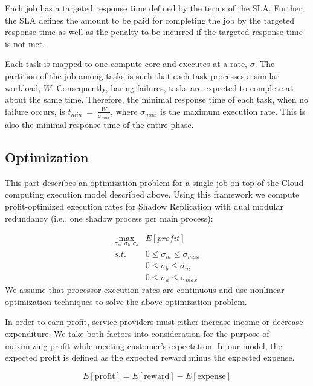 Each job has a targeted response time defined
by the terms of the SLA. Further, the SLA defines the amount to be
paid for completing the job by the targeted response time as well as
the penalty to be incurred if the targeted response time is not
met. 

Each task is mapped to one compute core and executes at a rate, $\sigma$. The partition of the job among tasks is
such that each task processes a similar
workload, $W$. Consequently, baring failures, tasks are expected to
complete at about the same time. Therefore, the minimal response time
of each task, when no failure occurs, is
$t_{min}~=~\frac{W}{\sigma_{max}}$, where $\sigma_{max}$ is the maximum execution rate. This is also the minimal response
time of the entire phase. 


\subsection{Optimization}
This part describes an optimization problem for a single job on top of the Cloud computing execution model described above. Using this
framework we compute profit-optimized execution rates for Shadow Replication with dual modular redundancy (i.e., one shadow process per main process): 

\begin{equation}
\label{optimization_problem}
\begin{alignedat}{2}
\max_{\sigma_m,\sigma_b,\sigma_a}     & E[profit] \\
s.t.                                 & 0 \leq \sigma_m \leq \sigma_{max} \\
                                     & 0 \leq \sigma_b \leq \sigma_{m} \\
                                     & 0 \leq \sigma_a \leq \sigma_{max} 
\end{alignedat}
\end{equation}
We assume that processor execution 
rates are continuous and use nonlinear optimization techniques
to solve the above optimization problem. 

In order to earn profit, service providers must either increase
income or decrease expenditure. We take both factors into
consideration for the purpose of maximizing profit while meeting
customer's expectation. In our model, the expected profit is defined as the expected reward minus the expected expense.

\begin{equation}
E[\text{profit}]=E[\text{reward}]-E[\text{expense}]
\end{equation}

